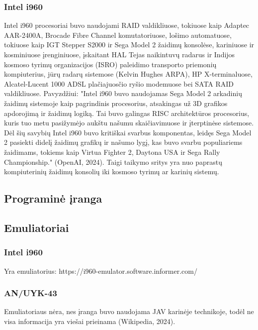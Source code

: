 \documentclass{article}
\begin{document}
\subsubsection{Intel i960}
Intel i960 procesoriai buvo naudojami RAID valdikliuose, tokiuose kaip Adaptec AAR-2400A, Brocade Fibre Channel komutatoriuose, lošimo automatuose, tokiuose kaip IGT Stepper S2000 ir Sega Model 2 žaidimų konsolėse, kariniuose ir kosminiuose įrenginiuose, įskaitant HAL Tejas naikintuvų radarus ir Indijos kosmoso tyrimų organizacijos (ISRO) paleidimo transporto priemonių kompiuterius, jūrų radarų sistemose (Kelvin Hughes ARPA), HP X-terminaluose, Alcatel-Lucent 1000 ADSL plačiajuosčio ryšio modemuose bei SATA RAID valdikliuose. Pavyzdžiui: "Intel i960 buvo naudojamas Sega Model 2 arkadinių žaidimų sistemoje kaip pagrindinis procesorius, atsakingas už 3D grafikos apdorojimą ir žaidimų logiką. Tai buvo galingas RISC architektūros procesorius, kuris tuo metu pasižymėjo aukštu našumu skaičiavimuose ir įterptinėse sistemose. Dėl šių savybių Intel i960 buvo kritiškai svarbus komponentas, leidęs Sega Model 2 pasiekti didelį žaidimų grafikų ir našumo lygį, kas buvo svarbu populiariems žaidimams, tokiems kaip Virtua Fighter 2, Daytona USA ir Sega Rally Championship." (OpenAI, 2024). Taigi taikymo sritys yra nuo paprastų kompiuterinių žaidimų konsolių iki kosmoso tyrimų ar karinių sistemų.
\subsection{Programinė įranga}
\subsection{Emuliatoriai}
\subsubsection{Intel i960}
Yra emuliatorius: https://i960-emulator.software.informer.com/
\subsubsection{AN/UYK-43}
Emuliatoriaus nėra, nes įranga buvo naudojama JAV karinėje technikoje, todėl ne visa informacija yra viešai prieinama (Wikipedia, 2024).
\end{document}
